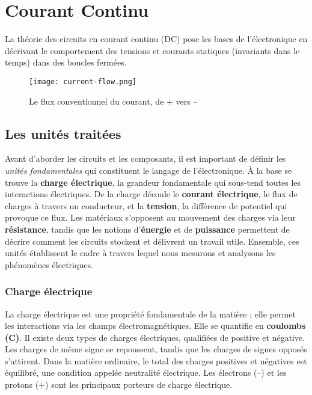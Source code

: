 \chapter{Courant Continu} \label{subsec:dc_circuit_theory}
La th\'eorie des circuits en courant continu (DC) pose les bases de l’\'electronique en
d\'ecrivant le comportement des tensions et courants statiques (invariants dans le temps)
dans des boucles ferm\'ees.\\

\begin{figure}[!h]
  \centering
  \texttt{[image: current-flow.png]}
  \caption{Le flux conventionnel du courant, de \(+\) vers --}
\end{figure}

\section{Les unit\'es trait\'ees} \label{subsec:units}
Avant d’aborder les circuits et les composants, il est important de d\'efinir
les \textit{unit\'es fondamentales} qui constituent le langage de l’\'electronique.
À la base se trouve la \textbf{charge \'electrique}, la grandeur fondamentale
qui sous-tend toutes les interactions \'electriques. De la charge d\'ecoule le \textbf{courant
\'electrique}, le flux de charges à travers un conducteur, et la \textbf{tension},
la diff\'erence de potentiel qui provoque ce flux. Les mat\'eriaux s’opposent au
mouvement des charges via leur \textbf{r\'esistance}, tandis que les notions
d’\textbf{\'energie} et de \textbf{puissance} permettent de d\'ecrire comment les circuits
stockent et d\'elivrent un travail utile. Ensemble, ces unit\'es \'etablissent le
cadre à travers lequel nous mesurons et analysons les ph\'enom\`enes \'electriques.\par
\vspace{\baselineskip}
\subsection{Charge \'electrique}\label{subsec:electric_charge}
La charge \'electrique est une propri\'et\'e fondamentale de la mati\`ere ; elle permet
les interactions via les champs \'electromagn\'etiques. Elle se quantifie en \textbf{coulombs
(\unit{\coulomb})}. Il existe deux types de charges \'electriques, qualifi\'ees de
positive et n\'egative. Les charges de m\^eme signe se repoussent, tandis que les charges
de signes oppos\'es s’attirent. Dans la mati\`ere ordinaire, le total des charges
positives et n\'egatives est \'equilibr\'e, une condition appel\'ee neutralit\'e \'electrique.
Les \'electrons (--) et les protons (\(+\)) sont les principaux porteurs de charge \'electrique.

